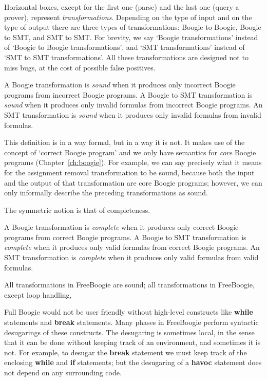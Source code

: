 \documentclass{llncs}
\begin{document}
Horizontal boxes, except for the first one (parse) and the last
one (query a prover), represent \emph{transformations}. Depending
on the type of input and on the type of output there are three
types of transformations: Boogie to Boogie, Boogie to SMT, and
SMT to SMT\null. For brevity, we say `Boogie transformations'
instead of `Boogie to Boogie transformations', and `SMT
transformations' instead of `SMT to SMT transformations'. All
these transformations are designed not to miss bugs, at the cost
of possible false positives.

\begin{definition}
A Boogie transformation is \emph{sound} when it produces only
incorrect Boogie programs from incorrect Boogie programs. A
Boogie to SMT transformation is \emph{sound} when it produces
only invalid formulas from incorrect Boogie programs. An SMT
transformation is \emph{sound} when it produces only invalid
formulas from invalid formulas.
\label{def:sound-transform}
\end{definition}

\begin{remark}
This definition is in a way formal, but in a way it is not.
It makes use of the concept of `correct Boogie program'
and we only have semantics for \emph{core} Boogie programs
(Chapter~\ref{ch:boogie}). For example, we can say precisely what
it means for the assignment removal transformation to be sound,
because both the input and the output of that transformation are
core Boogie programs; however, we can only informally describe
the preceding transformations as sound.
\end{remark}

The symmetric notion is that of completeness.

\begin{definition}
A Boogie transformation is \emph{complete} when it produces
only correct Boogie programs from correct Boogie programs. A
Boogie to SMT transformation is \emph{complete} when it produces
only valid formulas from correct Boogie programs. An SMT
transformation is \emph{complete} when it produces only valid
formulas from valid formulas.
\label{def:complete-transform}
\end{definition}

All transformations in FreeBoogie are sound; all transformations
in FreeBoogie, except loop handling,

Full Boogie would not be user friendly without high-level
constructs like \textbf{while} statements and \textbf{break}
statements. Many phases in FreeBoogie perform syntactic
desugarings of these constructs. The desugaring is sometimes
local, in the sense that it can be done without keeping track of
an environment, and sometimes it is not. For example, to desugar
the \textbf{break} statement we must keep track of the enclosing
\textbf{while} and \textbf{if} statements; but the desugaring of
a \textbf{havoc} statement does not depend on any surrounding
code.
\end{document}
